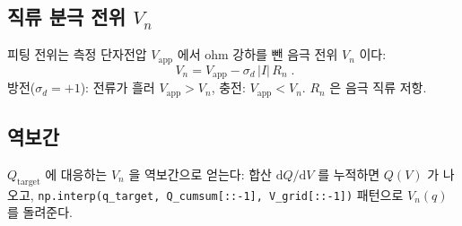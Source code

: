 \documentclass[11pt,a4paper]{article}
\newcommand{\dd}{\mathrm{d}}
\newcommand{\app}{\mathrm{app}}
\newcommand{\target}{\mathrm{target}}
\newcommand{\code}[1]{\texttt{#1}}
\begin{document}
\subsection{직류 분극 전위 $V_n$}
피팅 전위는 측정 단자전압 $V_\app$ 에서 ohm 강하를 뺀 음극 전위 $V_n$ 이다:
\begin{equation}
\boxed{\;V_n=V_\app-\sigma_d\,|I|\,R_n\;.}
\label{eq:vn}
\end{equation}
방전($\sigma_d=+1$): 전류가 흘러 $V_\app>V_n$, 충전: $V_\app<V_n$. $R_n$ 은 음극 직류 저항.

\subsection{역보간}
$Q_\target$ 에 대응하는 $V_n$ 을 역보간으로 얻는다: 합산 $\dd Q/\dd V$ 를 누적하면 $Q(V)$ 가 나오고,
\code{np.interp(q\_target, Q\_cumsum[::-1], V\_grid[::-1])} 패턴으로 $V_n(q)$ 를 돌려준다.

\end{document}
